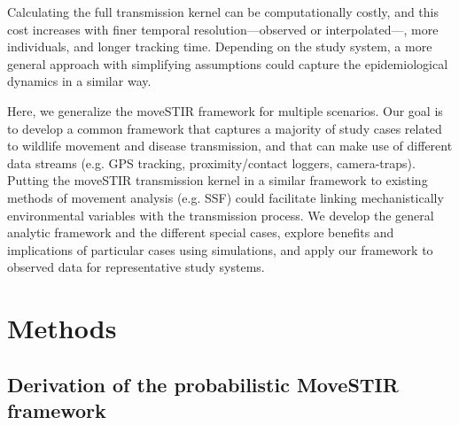 \documentclass[letterpaper]{article}
\begin{document}

Calculating the full transmission kernel can be computationally costly, and this cost increases with finer temporal resolution—observed or interpolated—, more individuals, and longer tracking time. Depending on the study system, a more general approach with simplifying assumptions could capture the epidemiological dynamics in a similar way. 


Here, we generalize the moveSTIR framework for multiple scenarios. Our goal is to develop a common framework that captures a majority of study cases related to wildlife movement and disease transmission, and that can make use of different data streams (e.g. GPS tracking, proximity/contact loggers, camera-traps). Putting the moveSTIR transmission kernel in a similar framework to existing methods of movement analysis (e.g. SSF) could facilitate linking mechanistically environmental variables with the transmission process. We develop the general analytic framework and the different special cases, explore benefits and implications of particular cases using simulations, and apply our framework to observed data for representative study systems.

\section*{Methods}
\subsection*{Derivation of the probabilistic MoveSTIR framework}
\end{document}
